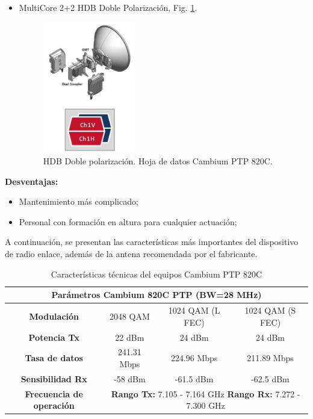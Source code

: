 \documentclass[12pt,a4paper]{book}
\begin{document}
\begin{itemize}
\begin{itemize}
	\item MultiCore 2+2 HDB Doble Polarización, Fig. \ref{fig_cambium_3}.
\begin{figure} [H]
\centering
\includegraphics[width= 4cm]{../figuras/cambium_3.jpg}
\caption{HDB Doble polarización. Hoja de datos Cambium PTP 820C.}
\label{fig_cambium_3}
\end{figure}	

	\end{itemize}
\end{itemize}

\noindent\textbf{Desventajas:}
\begin{itemize}
\item Mantenimiento más complicado;
\item Personal con formación en altura para cualquier actuación;
\end{itemize}

A continuación, se presentan las características más importantes del dispositivo de radio enlace, además de la antena recomendada por el fabricante.

\medskip

\begin{table} [H]
\begin{center} 
\begin{tabular}{|c|c|c|c|}
\hline 
\multicolumn{4}{|c|}{\textbf{Parámetros Cambium 820C PTP (BW=28 MHz)}} \\ 
\hline 
\textbf{Modulación} & 2048 QAM & 1024 QAM (L FEC) & 1024 QAM (S FEC) \\ 

\hline 
\textbf{Potencia Tx} & 22 dBm & 24 dBm & 24 dBm \\
\hline
\textbf{Tasa de datos} & 241.31 Mbps & 224.96 Mbps & 211.89 Mbps \\
\hline
\textbf{Sensibilidad Rx} & -58 dBm & -61.5 dBm & -62.5 dBm \\
\hline
\textbf{Frecuencia de operación} & \multicolumn{3}{|c|}{\textbf{Rango Tx:} 7.105 - 7.164 GHz \textbf{Rango Rx:} 7.272 - 7.300 GHz} \\
\hline
\end{tabular} 
\label{tab_caracteristicas_cambium}
\caption{Características técnicas del equipos Cambium PTP 820C}
\end{center}
\end{table}
\end{document}
